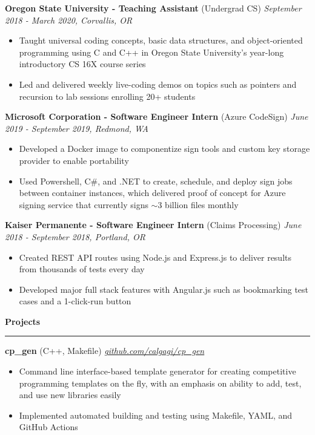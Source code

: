 \documentclass{article}
\def\hrulefill{\leavevmode\leaders\hrule height 1.2pt\hfill\kern\z}
\begin{document}
\vskip 0.1in

\noindent \normalsize \textbf{Oregon State University - Teaching Assistant} \footnotesize (Undergrad CS) \hfill \small \textit{September 2018 - March 2020, Corvallis, OR}
\begin{itemize}
\item Taught universal coding concepts, basic data structures, and object-oriented programming using C and C++ in Oregon State University’s year-long introductory CS 16X course series
\item Led and delivered weekly live-coding demos on topics such as pointers and recursion to lab sessions enrolling 20+ students
\end{itemize}

\vskip 0.1in

\noindent \normalsize \textbf{Microsoft Corporation - Software Engineer Intern} \footnotesize (Azure CodeSign) \hfill \small \textit{June 2019 - September 2019, Redmond, WA}
\begin{itemize}
\item Developed a Docker image to componentize sign tools and custom key storage provider to enable portability
\item Used Powershell, C\#, and .NET to create, schedule, and deploy sign jobs between container instances, which delivered proof of concept for Azure signing service that currently signs $\sim$3 billion files monthly
\end{itemize}

\vskip 0.1in

\noindent \normalsize \textbf{Kaiser Permanente - Software Engineer Intern} \footnotesize (Claims Processing) \hfill \small \textit{June 2018 - September 2018, Portland, OR}
\begin{itemize}
\item Created REST API routes using Node.js and Express.js to deliver results from thousands of tests every day
\item Developed major full stack features with Angular.js such as bookmarking test cases and a 1-click-run button
\end{itemize}

\vskip 0.1in

\noindent \large \textbf{Projects } \hrulefill
\vskip 0.1in
\noindent \normalsize \textbf{cp\_gen} \footnotesize (C++, Makefile) \hfill \small \textit{\href{https://github.com/calgagi/cp_gen}{github.com/calgagi/cp\_gen}}
\begin{itemize}
\item Command line interface-based template generator for creating competitive programming templates on the fly, with an emphasis on ability to add, test, and use new libraries easily
\item Implemented automated building and testing using Makefile, YAML, and GitHub Actions
\end{itemize}
\end{document}
